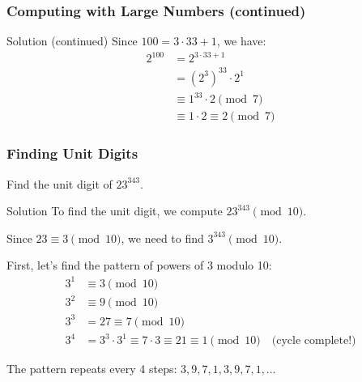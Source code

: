 \documentclass[10pt]{beamer}
\begin{document}
\begin{frame}
    \frametitle{Computing with Large Numbers (continued)}
    \begin{block}{Solution (continued)}
        Since $100 = 3 \cdot 33 + 1$, we have:
        \begin{align}
            2^{100} & = 2^{3 \cdot 33 + 1}               \\
                    & = (2^3)^{33} \cdot 2^1             \\
                    & \equiv 1^{33} \cdot 2 \pmod{7}     \\
                    & \equiv 1 \cdot 2 \equiv 2 \pmod{7}
        \end{align}
    \end{block}
\end{frame}

\begin{frame}
    \frametitle{Finding Unit Digits}
    \begin{example}
        Find the unit digit of $23^{343}$.
    \end{example}

    \begin{block}{Solution}
        To find the unit digit, we compute $23^{343} \pmod{10}$.

        Since $23 \equiv 3 \pmod{10}$, we need to find $3^{343} \pmod{10}$.

        First, let's find the pattern of powers of 3 modulo 10:
        \begin{align}
            3^1 & \equiv 3 \pmod{10}                                                                           \\
            3^2 & \equiv 9 \pmod{10}                                                                           \\
            3^3 & = 27 \equiv 7 \pmod{10}                                                                      \\
            3^4 & = 3^3 \cdot 3^1 \equiv 7 \cdot 3 \equiv 21 \equiv 1 \pmod{10} \quad \text{(cycle complete!)}
        \end{align}

        The pattern repeats every 4 steps: $3, 9, 7, 1, 3, 9, 7, 1, \ldots$
    \end{block}
\end{frame}
\end{document}
